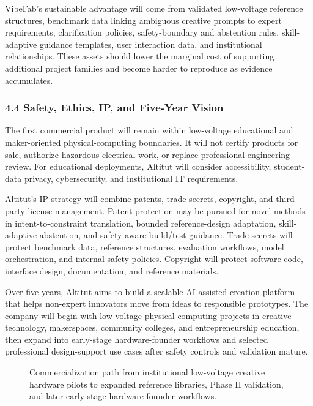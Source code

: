 VibeFab's sustainable advantage will come from validated low-voltage reference structures, benchmark data linking ambiguous creative prompts to expert requirements, clarification policies, safety-boundary and abstention rules, skill-adaptive guidance templates, user interaction data, and institutional relationships. These assets should lower the marginal cost of supporting additional project families and become harder to reproduce as evidence accumulates.

\subsubsection*{4.4 Safety, Ethics, IP, and Five-Year Vision}

The first commercial product will remain within low-voltage educational and maker-oriented physical-computing boundaries. It will not certify products for sale, authorize hazardous electrical work, or replace professional engineering review. For educational deployments, Altitut will consider accessibility, student-data privacy, cybersecurity, and institutional IT requirements.

Altitut's IP strategy will combine patents, trade secrets, copyright, and third-party license management. Patent protection may be pursued for novel methods in intent-to-constraint translation, bounded reference-design adaptation, skill-adaptive abstention, and safety-aware build/test guidance. Trade secrets will protect benchmark data, reference structures, evaluation workflows, model orchestration, and internal safety policies. Copyright will protect software code, interface design, documentation, and reference materials.

Over five years, Altitut aims to build a scalable AI-assisted creation platform that helps non-expert innovators move from ideas to responsible prototypes. The company will begin with low-voltage physical-computing projects in creative technology, makerspaces, community colleges, and entrepreneurship education, then expand into early-stage hardware-founder workflows and selected professional design-support use cases after safety controls and validation mature.

\begin{figure}[H]
\centering
{}
\caption{Commercialization path from institutional low-voltage creative hardware pilots to expanded reference libraries, Phase II validation, and later early-stage hardware-founder workflows.}
\label{fig:commercialization_path}
\end{figure}

